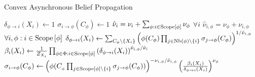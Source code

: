 \begin{frame}{Convex Asynchronous Belief Propagation}
    \begin{algorithm}[H]
        \label{alg:convex-asynchronous-bp}
        \caption{Convex Asynchronous Belief Propagation}
        \KwInput{$\Phi$, $\kappa$}
        {
            $\delta_{\phi \rightarrow i}(X_i) \leftarrow 1$\;
            $\sigma_{i \rightarrow \phi}(C_{\phi}) \leftarrow 1$\;
        }
        \pause
        $\hat{\nu}_i = \nu_i + \sum_{\phi : i \in \Scope[\phi]} \nu_{\phi}$ $\forall i$\;
        $\hat{\nu}_{i,\phi} = \nu_\phi + \nu_{i, \phi}$ $\forall i,\phi : i \in \Scope[\phi]$\;
        \pause
        {
        {
        \pause
            {
                $\delta_{\phi \rightarrow i}(X_i) \leftarrow \sum_{C_{\phi} \backslash \{X_i\}} \left( 
                \phi(C_{\phi}) \prod_{j \in \text{Nb}(\phi) \backslash \{i\}} \sigma_{j \rightarrow \phi}(C_{\phi})
               \right)^{1/\hat{\nu}_{i,\phi}} $\;
            }
        \pause
            $\beta_i(X_i) \leftarrow \frac{1}{Z_{X_i}} \prod_{\phi \in \Phi : i \in \Scope[\phi]} \left( \delta_{\phi \rightarrow i}(X_i) \right)^{\hat{\nu}_{i,\phi}/\hat{\nu}_i}$\;
        \pause
            {
                $\sigma_{i \rightarrow \phi}(C_{\phi}) \leftarrow 
                \left( \phi(C_{_{\phi}} \prod_{j \in \Scope[\phi] \backslash \{i\}} \sigma_{j \rightarrow \phi} (C_{\phi}) )\right)^{-\nu_{i,\phi}/\hat{\nu}_{i,\phi}}
                \left( \frac{\beta_i(X_i)}{\delta_{\phi \rightarrow i}(X_i)} \right)^{\nu_{\phi}}
                $\;
            }
        }
        }
    \end{algorithm}
\end{frame}

